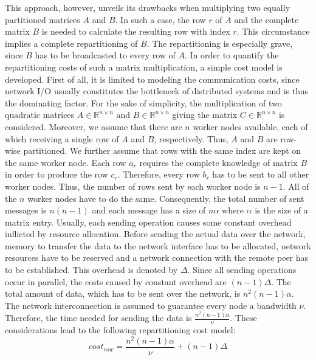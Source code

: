 This approach, however, unveils its drawbacks when multiplying two equally partitioned matrices $A$ and $B$. In such a case, the row $r$ of $A$ and the complete matrix $B$ is needed to calculate the resulting row with index $r$. This circumstance implies a complete repartitioning of $B$. The repartitioning is especially grave, since $B$ has to be broadcasted to every row of $A$. In order to quantify the repartitioning costs of such a matrix multiplication, a simple cost model is developed. First of all, it is limited to modeling the communication costs, since network I/O usually constitutes the bottleneck of distributed systems and is thus the dominating factor. For the sake of simplicity, the multiplication of two quadratic matrices $A \in \mathbb{R}^{n\times n}$ and $B \in \mathbb{R}^{n\times n}$ giving the matrix $C\in \mathbb{R}^{n \times n}$ is considered. Moreover, we assume that there are $n$ worker nodes available, each of which receiving a single row of $A$ and $B$, respectively. Thus, $A$ and $B$ are row-wise partitioned. We further assume that rows with the same index are kept on the same worker node. Each row $a_r$ requires the complete knowledge of matrix $B$ in order to produce the row $c_r$. Therefore, every row $b_r$ has to be sent to all other worker nodes. Thus, the number of rows sent by each worker node is $n-1$. All of the $n$ worker nodes have to do the same. Consequently, the total number of sent messages is $n(n-1)$ and each message has a size of $n\alpha$ where $\alpha$ is the size of a matrix entry. Usually, each sending operation causes some constant overhead inflicted by resource allocation. Before sending the actual data over the network, memory to transfer the data to the network interface has to be allocated, network resources have to be reserved and a network connection with the remote peer has to be established. This overhead is denoted by $\Delta$. Since all sending operations occur in parallel, the costs caused by constant overhead are $(n-1)\Delta$. The total amount of data, which has to be sent over the network, is $n^2(n-1)\alpha$. The network interconnection is assumed to guarantee every node a bandwidth $\nu$. Therefore, the time needed for sending the data is $\frac{n^2(n-1)\alpha}{\nu}$. These considerations lead to the following repartitioning cost model:
\begin{displaymath}
	cost_{row} = \frac{n^2(n-1)\alpha}{\nu} + (n-1)\Delta
\end{displaymath}
